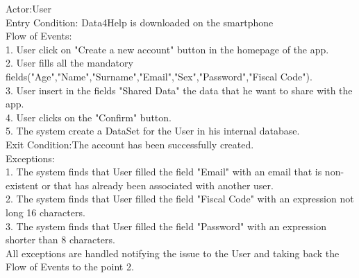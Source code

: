         
Actor:User\\
Entry Condition: Data4Help is downloaded on the smartphone\\
Flow of Events:\\
1. User click on "Create a new account" button in the homepage of the app.\\
2. User fills all the mandatory fields("Age","Name","Surname","Email","Sex","Password","Fiscal Code").\\
3. User insert in the fields "Shared Data" the data that he want to share with the app.\\
4. User clicks on the "Confirm" button.\\
5. The system create a DataSet for the User in his internal database.\\
Exit Condition:The account has been successfully created.\\
Exceptions:\\
1. The system finds that User filled the field "Email"  with an email that is non-existent or that has already been associated with another user.\\
2. The system finds that User filled the field "Fiscal Code" with an expression not long 16 characters.\\
3. The system finds that User filled the field "Password" with an expression shorter than 8 characters.\\
All exceptions are handled notifying the issue to the User and taking back the Flow of Events to the point 2.\\


